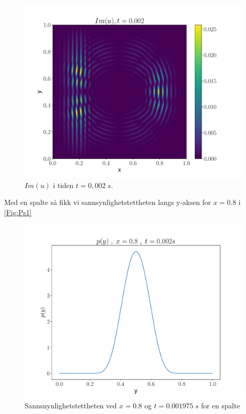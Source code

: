 \documentclass[reprint,english,notitlepage]{revtex4-2}  %
\begin{document}
\begin{figure}[H]
	\centering
	\includegraphics[scale=0.45, trim={3cm 0 0 0}]{../Images/ImshowIm0002sl2.pdf}
	\caption{$Im(u) $ i tiden $t = 0,002 \; s$.}
	\label{Fig:s2Imt02}
\end{figure}

Med en spalte så fikk vi sannsynlighetstettheten langs y-aksen for $x = 0.8$ i \autoref{Fig:Ps1}

\begin{figure}[H]
	\centering
	\includegraphics[scale=0.4]{../Images/ScreenProb1Slit.pdf}
	\caption{Sannsnynlighetstettheten ved $x = 0.8$ og $t = 0.001975 \; s$ for en spalte}
	\label{Fig:Ps1}
\end{figure}
\end{document}
